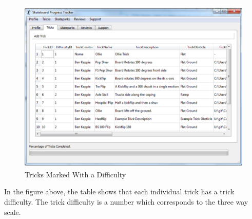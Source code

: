 \begin{figure}[H]
    \includegraphics[width=\textwidth]{./Evaluation/images/TricksTableNFS.pdf}
    \caption{Tricks Marked With a Difficulty} \label{fig:TricksTableDiff}
\end{figure}

In the figure above, the table shows that each individual trick has a trick difficulty. The trick difficulty is a number which corresponds to the three way scale.

